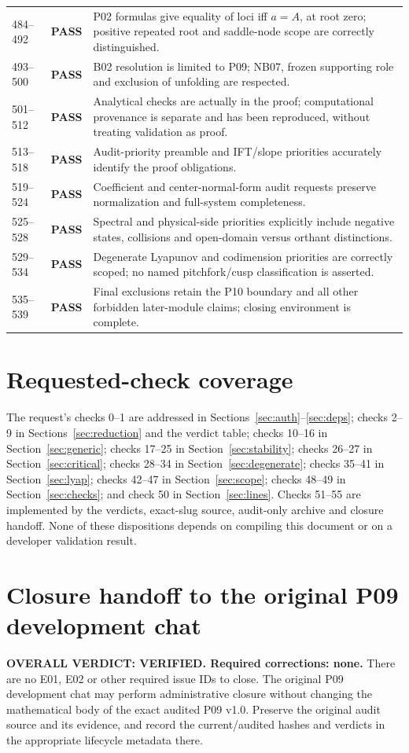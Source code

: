 \documentclass[11pt]{article}
\newcommand{\pass}{\textbf{PASS}}
\begin{document}
\begin{longtable}{@{}p{}p{}p{}@{}}
484--492 & \pass & P02 formulas give equality of loci iff $a=A$, at root zero; positive repeated root and saddle-node scope are correctly distinguished.\\
493--500 & \pass & B02 resolution is limited to P09; NB07, frozen supporting role and exclusion of unfolding are respected.\\
501--512 & \pass & Analytical checks are actually in the proof; computational provenance is separate and has been reproduced, without treating validation as proof.\\
513--518 & \pass & Audit-priority preamble and IFT/slope priorities accurately identify the proof obligations.\\
519--524 & \pass & Coefficient and center-normal-form audit requests preserve normalization and full-system completeness.\\
525--528 & \pass & Spectral and physical-side priorities explicitly include negative states, collisions and open-domain versus orthant distinctions.\\
529--534 & \pass & Degenerate Lyapunov and codimension priorities are correctly scoped; no named pitchfork/cusp classification is asserted.\\
535--539 & \pass & Final exclusions retain the P10 boundary and all other forbidden later-module claims; closing environment is complete.\\
\bottomrule
\end{longtable}

\section{Requested-check coverage}
The request's checks 0--1 are addressed in Sections~\ref{sec:auth}--\ref{sec:deps};
checks 2--9 in Sections~\ref{sec:reduction} and the verdict table;
checks 10--16 in Section~\ref{sec:generic}; checks 17--25 in
Section~\ref{sec:stability}; checks 26--27 in Section~\ref{sec:critical};
checks 28--34 in Section~\ref{sec:degenerate}; checks 35--41 in
Section~\ref{sec:lyap}; checks 42--47 in Section~\ref{sec:scope}; checks
48--49 in Section~\ref{sec:checks}; and check 50 in Section~\ref{sec:lines}.
Checks 51--55 are implemented by the verdicts, exact-slug source, audit-only
archive and closure handoff. None of these dispositions depends on compiling
this document or on a developer validation result.

\section{Closure handoff to the original P09 development chat}
\label{sec:handoff}
\textbf{OVERALL VERDICT: VERIFIED. Required corrections: none.}
There are no E01, E02 or other required issue IDs to close. The original
P09 development chat may perform administrative closure without changing
the mathematical body of the exact audited P09 v1.0. Preserve the original
audit source and its evidence, and record the current/audited hashes and
verdicts in the appropriate lifecycle metadata there.
\end{document}

